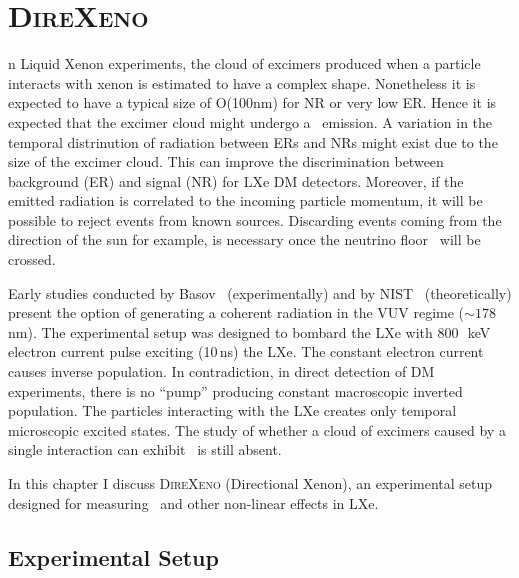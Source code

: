 %
%
\let\textcircled=\pgftextcircled
\chapter{\textsc{DireXeno}}
\label{chap:Direxeno}
n Liquid Xenon experiments, the cloud of excimers produced when a particle interacts with xenon is estimated to have a complex shape. Nonetheless it is expected to have a typical size of O(100nm) for NR or very low ER. Hence it is expected that the excimer cloud might undergo a \superradiance\ emission. A variation in the temporal distrinution of radiation between ERs and NRs might exist due to the size of the excimer cloud. This can improve the discrimination between background (ER) and signal (NR) for LXe DM detectors. Moreover, if the emitted radiation is correlated to the incoming particle momentum, it will be possible to reject events from known sources. Discarding events coming from the direction of the sun for example, is necessary once the neutrino floor~\cite{Billard:2013qya} will be crossed.  

Early studies conducted by Basov~\citep{BasovSRTheory} (experimentally) and by NIST~\cite{stim} (theoretically) present the option of generating a coherent radiation in the VUV regime ($\sim178$\,nm). The experimental setup was designed to bombard the LXe with 800~\,keV electron current pulse exciting (10\,ns) the LXe. The constant electron current causes inverse population. In contradiction, in direct detection of DM experiments, there is no ``pump'' producing constant macroscopic inverted population. The particles interacting with the LXe creates only temporal microscopic excited states.  The study of whether a cloud of excimers caused by a single interaction can exhibit \superradiance\ is still absent.

In this chapter I discuss \textsc{DireXeno} (Directional Xenon), an experimental setup designed for measuring \superradiance\ and other non-linear effects in LXe.

\section{Experimental Setup}
\label{expSetup}


